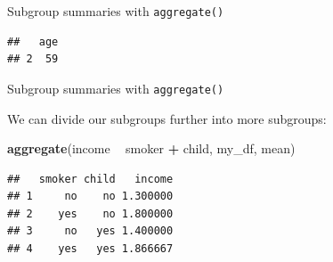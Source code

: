 \documentclass[ignorenonframetext,]{beamer}
\newenvironment{Shaded}{\begin{snugshade}}{\end{snugshade}}
\newcommand{\DataTypeTok}[1]{\textcolor[rgb]{0.13,0.29,0.53}{#1}}
\newcommand{\KeywordTok}[1]{\textcolor[rgb]{0.13,0.29,0.53}{\textbf{#1}}}
\newcommand{\NormalTok}[1]{#1}
\newcommand{\OperatorTok}[1]{\textcolor[rgb]{0.81,0.36,0.00}{\textbf{#1}}}
\newcommand{\StringTok}[1]{\textcolor[rgb]{0.31,0.60,0.02}{#1}}
\begin{document}
\begin{frame}[fragile]{Subgroup summaries with \texttt{aggregate()}}
\protect\hypertarget{subgroup-summaries-with-aggregate-18}{}

\begin{Shaded}
\end{Shaded}

\begin{verbatim}
##   age
## 2  59
\end{verbatim}

\end{frame}

\begin{frame}[fragile]{Subgroup summaries with \texttt{aggregate()}}
\protect\hypertarget{subgroup-summaries-with-aggregate-19}{}

We can divide our subgroups further into more subgroups:

\begin{Shaded}
\begin{Highlighting}[]
\KeywordTok{aggregate}\NormalTok{(income }\OperatorTok{~}\StringTok{ }\NormalTok{smoker }\OperatorTok{+}\StringTok{ }\NormalTok{child, my_df, mean)}
\end{Highlighting}
\end{Shaded}

\begin{verbatim}
##   smoker child   income
## 1     no    no 1.300000
## 2    yes    no 1.800000
## 3     no   yes 1.400000
## 4    yes   yes 1.866667
\end{verbatim}

\end{frame}
\end{document}
